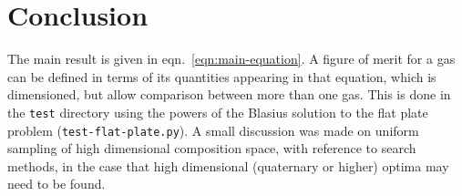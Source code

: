 \documentclass{article}
\begin{document}
\section{Conclusion}

The main result is given in eqn.~\ref{eqn:main-equation}. A figure of merit for
a gas can be defined in terms of its quantities appearing in that equation,
which is dimensioned, but allow comparison between more than one gas. This is
done in the \texttt{test} directory using the powers of the Blasius solution to
the flat plate problem (\texttt{test-flat-plate.py}). A small discussion was
made on uniform sampling of high dimensional composition space, with reference
to search methods, in the case that high dimensional (quaternary or higher)
optima may need to be found.

\printbibliography
\end{document}
